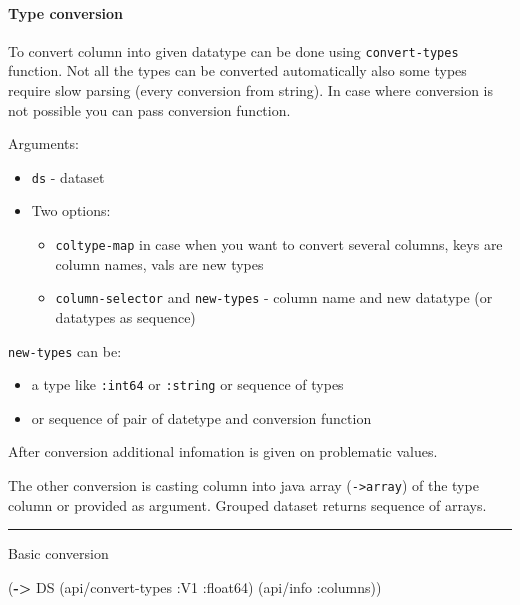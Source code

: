 \documentclass[]{article}
\newenvironment{Shaded}{\begin{snugshade}}{\end{snugshade}}
\newcommand{\KeywordTok}[1]{\textcolor[rgb]{0.13,0.29,0.53}{\textbf{#1}}}
\newcommand{\AttributeTok}[1]{\textcolor[rgb]{0.77,0.63,0.00}{#1}}
\newcommand{\NormalTok}[1]{#1}
\providecommand{\tightlist}{%
  \setlength{\itemsep}{0pt}\setlength{\parskip}{0pt}}
\let\oldparagraph\paragraph
\renewcommand{\paragraph}[1]{\oldparagraph{#1}\mbox{}}
\begin{document}
\paragraph{Type conversion}\label{type-conversion}

To convert column into given datatype can be done using
\texttt{convert-types} function. Not all the types can be converted
automatically also some types require slow parsing (every conversion
from string). In case where conversion is not possible you can pass
conversion function.

Arguments:

\begin{itemize}
\tightlist
\item
  \texttt{ds} - dataset
\item
  Two options:

  \begin{itemize}
  \tightlist
  \item
    \texttt{coltype-map} in case when you want to convert several
    columns, keys are column names, vals are new types
  \item
    \texttt{column-selector} and \texttt{new-types} - column name and
    new datatype (or datatypes as sequence)
  \end{itemize}
\end{itemize}

\texttt{new-types} can be:

\begin{itemize}
\tightlist
\item
  a type like \texttt{:int64} or \texttt{:string} or sequence of types
\item
  or sequence of pair of datetype and conversion function
\end{itemize}

After conversion additional infomation is given on problematic values.

The other conversion is casting column into java array
(\texttt{-\textgreater{}array}) of the type column or provided as
argument. Grouped dataset returns sequence of arrays.

\begin{center}\rule{0.5\linewidth}{0.5pt}\end{center}

Basic conversion

\begin{Shaded}
\begin{Highlighting}[]
\NormalTok{(}\KeywordTok{->}\NormalTok{ DS}
\NormalTok{    (api/convert-types }\AttributeTok{:V1} \AttributeTok{:float64}\NormalTok{)}
\NormalTok{    (api/info }\AttributeTok{:columns}\NormalTok{))}
\end{Highlighting}
\end{Shaded}
\end{document}
